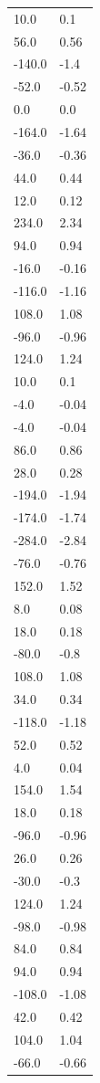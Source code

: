 \begin{longtable}{ll}
10.0 & 0.1 \\
56.0 & 0.56 \\
-140.0 & -1.4 \\
-52.0 & -0.52 \\
0.0 & 0.0 \\
-164.0 & -1.64 \\
-36.0 & -0.36 \\
44.0 & 0.44 \\
12.0 & 0.12 \\
234.0 & 2.34 \\
94.0 & 0.94 \\
-16.0 & -0.16 \\
-116.0 & -1.16 \\
108.0 & 1.08 \\
-96.0 & -0.96 \\
124.0 & 1.24 \\
10.0 & 0.1 \\
-4.0 & -0.04 \\
-4.0 & -0.04 \\
86.0 & 0.86 \\
28.0 & 0.28 \\
-194.0 & -1.94 \\
-174.0 & -1.74 \\
-284.0 & -2.84 \\
-76.0 & -0.76 \\
152.0 & 1.52 \\
8.0 & 0.08 \\
18.0 & 0.18 \\
-80.0 & -0.8 \\
108.0 & 1.08 \\
34.0 & 0.34 \\
-118.0 & -1.18 \\
52.0 & 0.52 \\
4.0 & 0.04 \\
154.0 & 1.54 \\
18.0 & 0.18 \\
-96.0 & -0.96 \\
26.0 & 0.26 \\
-30.0 & -0.3 \\
124.0 & 1.24 \\
-98.0 & -0.98 \\
84.0 & 0.84 \\
94.0 & 0.94 \\
-108.0 & -1.08 \\
42.0 & 0.42 \\
104.0 & 1.04 \\
-66.0 & -0.66 \\

\end{longtable}
